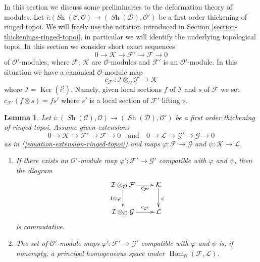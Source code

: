 \documentclass{stacks-project}
\theoremstyle{plain}
\newtheorem{lemma}[subsection]{Lemma}
\theoremstyle{definition}
\theoremstyle{remark}
\numberwithin{equation}{subsection}
\def\Hom{\mathop{\mathrm{Hom}}\nolimits}
\def\Sh{\mathop{\mathit{Sh}}\nolimits}
\def\Ker{\mathop{\mathrm{Ker}}}
\begin{document}
\noindent
In this section we discuss some preliminaries to the deformation theory
of modules. Let
$i : (\Sh(\mathcal{C}, \mathcal{O}) \to (\Sh(\mathcal{D}), \mathcal{O}')$
be a first order thickening of ringed topoi. We will freely use the notation
introduced in Section \ref{section-thickenings-ringed-topoi},
in particular we will identify the underlying topological topoi.
In this section we consider short exact sequences
\begin{equation}
\label{equation-extension-ringed-topoi}
0 \to \mathcal{K} \to \mathcal{F}' \to \mathcal{F} \to 0
\end{equation}
of $\mathcal{O}'$-modules, where $\mathcal{F}$, $\mathcal{K}$ are
$\mathcal{O}$-modules and $\mathcal{F}'$ is an $\mathcal{O}'$-module.
In this situation we have a canonical $\mathcal{O}$-module map
$$
c_{\mathcal{F}'} :
\mathcal{I} \otimes_\mathcal{O} \mathcal{F}
\longrightarrow
\mathcal{K}
$$
where $\mathcal{I} = \Ker(i^\sharp)$.
Namely, given local sections $f$ of $\mathcal{I}$ and $s$
of $\mathcal{F}$ we set $c_{\mathcal{F}'}(f \otimes s) = fs'$
where $s'$ is a local section of $\mathcal{F}'$ lifting $s$.

\begin{lemma}
\label{lemma-inf-map-ringed-topoi}
Let $i : (\Sh(\mathcal{C}), \mathcal{O}) \to (\Sh(\mathcal{D}), \mathcal{O}')$
be a first order thickening of ringed topoi. Assume given
extensions
$$
0 \to \mathcal{K} \to \mathcal{F}' \to \mathcal{F} \to 0
\quad\text{and}\quad
0 \to \mathcal{L} \to \mathcal{G}' \to \mathcal{G} \to 0
$$
as in (\ref{equation-extension-ringed-topoi})
and maps $\varphi : \mathcal{F} \to \mathcal{G}$ and
$\psi : \mathcal{K} \to \mathcal{L}$.
\begin{enumerate}
\item If there exists an $\mathcal{O}'$-module
map $\varphi' : \mathcal{F}' \to \mathcal{G}'$ compatible with $\varphi$
and $\psi$, then the diagram
$$
\xymatrix{
\mathcal{I} \otimes_\mathcal{O} \mathcal{F}
\ar[r]_-{c_{\mathcal{F}'}} \ar[d]_{1 \otimes \varphi} &
\mathcal{K} \ar[d]^\psi \\
\mathcal{I} \otimes_\mathcal{O} \mathcal{G}
\ar[r]^-{c_{\mathcal{G}'}} &
\mathcal{L}
}
$$
is commutative.
\item The set of $\mathcal{O}'$-module
maps $\varphi' : \mathcal{F}' \to \mathcal{G}'$ compatible with $\varphi$
and $\psi$ is, if nonempty, a principal homogeneous space under
$\Hom_\mathcal{O}(\mathcal{F}, \mathcal{L})$.
\end{enumerate}
\end{lemma}
\end{document}
